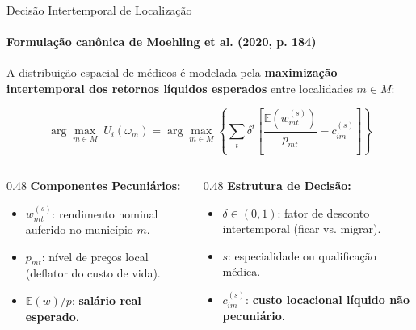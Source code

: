 \documentclass[aspectratio=169, 10pt]{beamer}
\begin{document}
\begin{frame}{Decisão Intertemporal de Localização}
  \framesubtitle{Formulação canônica de Moehling et al. (2020, p. 184)}
  
  A distribuição espacial de médicos é modelada pela \textbf{maximização intertemporal dos retornos líquidos esperados} entre localidades $m \in M$:

  \begin{equation}
    \arg\max_{m \in M}\; U_i(\omega_m) = \arg\max_{m \in M} \left\{ \sum_{t} \delta^t \left[ \frac{\mathbb{E}\!\left(w_{mt}^{(s)}\right)}{p_{mt}} - c_{im}^{(s)} \right] \right\}
  \end{equation}

  \vspace{0.3cm}
  \begin{columns}[T]
    \begin{column}{0.48\textwidth}
      \textbf{Componentes Pecuniários:}
      \begin{itemize}
        \item $w_{mt}^{(s)}$: rendimento nominal auferido no município $m$.
        \item $p_{mt}$: nível de preços local (deflator do custo de vida).
        \item $\mathbb{E}(w)/p$: \textbf{salário real esperado}.
      \end{itemize}
    \end{column}

    \begin{column}{0.48\textwidth}
      \textbf{Estrutura de Decisão:}
      \begin{itemize}
        \item $\delta \in (0,1)$: fator de desconto intertemporal (ficar vs. migrar).
        \item $s$: especialidade ou qualificação médica.
        \item $c_{im}^{(s)}$: \textbf{custo locacional líquido não pecuniário}.
      \end{itemize}
    \end{column}
  \end{columns}
\end{frame}
\end{document}
